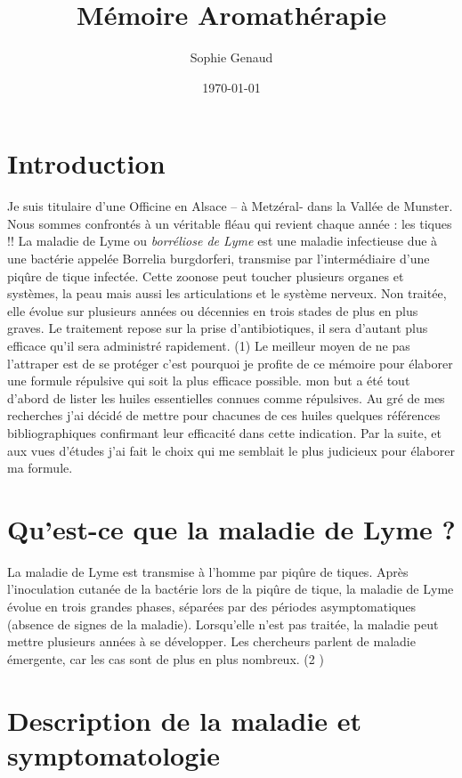 \documentclass[12pt,a4wide]{article}
\author{Sophie Genaud}
\date{\today}
\title{Mémoire Aromathérapie}
\begin{document}
\maketitle
\tableofcontents


\section{Introduction}
\label{sec-1}

        Je suis titulaire d'une Officine en  Alsace – à Metzéral- dans la Vallée
de  Munster. Nous  sommes confrontés  à un  véritable fléau  qui revient  chaque
année  : les  tiques !!   La maladie  de Lyme  ou \emph{borréliose  de Lyme}  est une
maladie infectieuse due  à une bactérie appelée  Borrelia burgdorferi, transmise
par l'intermédiaire d'une  piqûre de tique infectée. Cette  zoonose peut toucher
plusieurs  organes et  systèmes,  la peau  mais aussi  les  articulations et  le
système nerveux. Non  traitée, elle évolue sur plusieurs années  ou décennies en
trois  stades  de  plus en  plus  graves.  Le  traitement  repose sur  la  prise
d'antibiotiques,  il   sera  d'autant   plus  efficace  qu'il   sera  administré
rapidement. (1) Le meilleur moyen de ne  pas l'attraper est de se protéger c'est
pourquoi je profite  de ce mémoire pour élaborer une  formule répulsive qui soit
la plus  efficace possible.  mon but  a été  tout d'abord  de lister  les huiles
essentielles connues comme  répulsives. Au gré de mes recherches  j'ai décidé de
mettre  pour  chacunes  de   ces  huiles  quelques  références  bibliographiques
confirmant leur  efficacité dans  cette indication.  Par la  suite, et  aux vues
d'études j'ai fait le  choix qui me semblait le plus  judicieux pour élaborer ma
formule.

\section{Qu'est-ce que la maladie de Lyme ?}
\label{sec-2}

La  maladie  de Lyme  est  transmise  à l'homme  par  piqûre  de tiques.   Après
 l'inoculation cutanée de la bactérie lors de  la piqûre de tique, la maladie de
 Lyme évolue en trois grandes  phases, séparées par des périodes asymptomatiques
 (absence de  signes de la maladie).  Lorsqu'elle n'est pas traitée,  la maladie
 peut mettre plusieurs années à se développer. Les chercheurs parlent de maladie
 émergente, car les cas sont de plus en plus nombreux. (2 )

\section{Description de la maladie et symptomatologie}
\label{sec-3}
\end{document}
